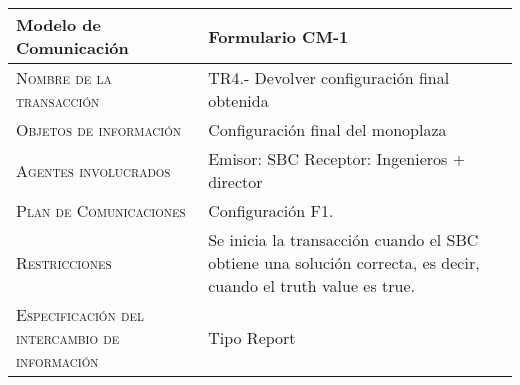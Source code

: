 \documentclass[12pt,a4paper,twoside,spanish]{article}      %
\begin{document}
\begin{table}[H]
\scriptsize
\begin{tabularx}{\textwidth}{|l|X|} \hline
\textbf{Modelo de Comunicación} & \textbf{Formulario CM-1} \\ \hline\hline

\textsc{Nombre de la transacción} & TR4.- Devolver configuración final obtenida

\\ \hline
\textsc{Objetos de información} & Configuración final del monoplaza 
\\ \hline
\textsc{Agentes involucrados} &  Emisor: SBC
                                 Receptor: Ingenieros + director \\ \hline
\textsc{Plan de Comunicaciones} &  Configuración F1.
\\ \hline
\textsc{Restricciones} &  Se inicia la transacción cuando el SBC obtiene una solución correcta, es decir, cuando el truth value es true. \\ \hline
\textsc{Especificación del intercambio de información} &  Tipo Report\\ \hline
\end{tabularx}
  \label{tab.CM1_2}
\end{table}

\end{document}

